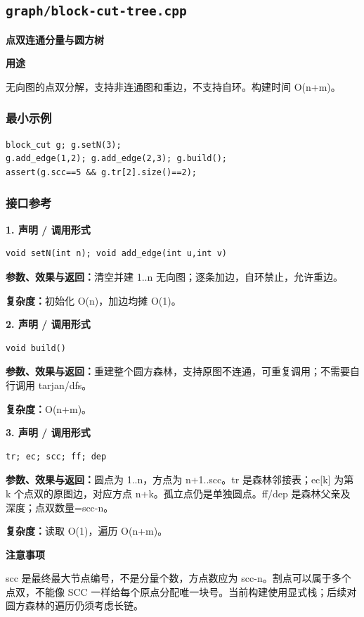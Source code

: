 \documentclass[UTF8,a4paper,10pt]{ctexart}
\newcommand{\TemplUsage}[1]{\textbf{用途}\par #1\par}
\newcommand{\TemplNote}[1]{\textbf{注意事项}\par #1\par}
\begin{document}
\subsection{\texttt{graph/block-cut-tree.cpp}}
\textbf{点双连通分量与圆方树}\par
\TemplUsage{无向图的点双分解，支持非连通图和重边，不支持自环。构建时间 O(n+m)。}
\subsubsection*{最小示例}
\begin{lstlisting}
block_cut g; g.setN(3);
g.add_edge(1,2); g.add_edge(2,3); g.build();
assert(g.scc==5 && g.tr[2].size()==2);
\end{lstlisting}
\subsubsection*{接口参考}
\noindent\begin{minipage}{\textwidth}
\textbf{1. 声明 / 调用形式}
\begin{lstlisting}
void setN(int n); void add_edge(int u,int v)
\end{lstlisting}
\textbf{参数、效果与返回：}清空并建 1..n 无向图；逐条加边，自环禁止，允许重边。

\textbf{复杂度：}初始化 O(n)，加边均摊 O(1)。

\end{minipage}\par\vspace{0.4em}
\noindent\begin{minipage}{\textwidth}
\textbf{2. 声明 / 调用形式}
\begin{lstlisting}
void build()
\end{lstlisting}
\textbf{参数、效果与返回：}重建整个圆方森林，支持原图不连通，可重复调用；不需要自行调用 tarjan/dfs。

\textbf{复杂度：}O(n+m)。

\end{minipage}\par\vspace{0.4em}
\noindent\begin{minipage}{\textwidth}
\textbf{3. 声明 / 调用形式}
\begin{lstlisting}
tr; ec; scc; ff; dep
\end{lstlisting}
\textbf{参数、效果与返回：}圆点为 1..n，方点为 n+1..scc。tr 是森林邻接表；ec[k] 为第 k 个点双的原图边，对应方点 n+k。孤立点仍是单独圆点。ff/dep 是森林父亲及深度；点双数量=scc-n。

\textbf{复杂度：}读取 O(1)，遍历 O(n+m)。

\TemplNote{scc 是最终最大节点编号，不是分量个数，方点数应为 scc-n。割点可以属于多个点双，不能像 SCC 一样给每个原点分配唯一块号。当前构建使用显式栈；后续对圆方森林的遍历仍须考虑长链。}
\end{minipage}\par\vspace{0.4em}
\clearpage
\end{document}
